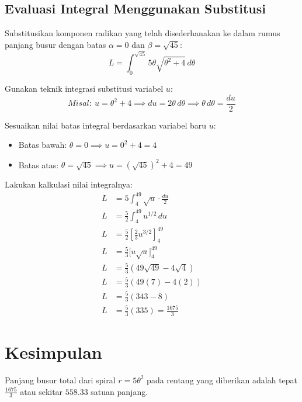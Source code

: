 \documentclass[11pt,a4paper]{article}
\begin{document}
\subsection{Evaluasi Integral Menggunakan Substitusi}
Substitusikan komponen radikan yang telah disederhanakan ke dalam rumus panjang busur dengan batas $\alpha = 0$ dan $\beta = \sqrt{45}$:
\begin{equation}
  L = \int_{0}^{\sqrt{45}} 5\theta\sqrt{\theta^2 + 4} \, d\theta
\end{equation}

Gunakan teknik integrasi substitusi variabel $u$:
\begin{equation*}
  Misal: \ u = \theta^2 + 4 \implies du = 2\theta \, d\theta \implies \theta \, d\theta = \frac{du}{2}
\end{equation*}

Sesuaikan nilai batas integral berdasarkan variabel baru $u$:
\begin{itemize}
  \item Batas bawah: $\theta = 0 \implies u = 0^2 + 4 = 4$
  \item Batas atas: $\theta = \sqrt{45} \implies u = (\sqrt{45})^2 + 4 = 49$
\end{itemize}

Lakukan kalkulasi nilai integralnya:
\begin{align*}
  L &= 5 \int_{4}^{49} \sqrt{u} \cdot \frac{du}{2} \\
  L &= \frac{5}{2} \int_{4}^{49} u^{1/2} \, du \\
  L &= \frac{5}{2} \left[ \frac{2}{3}u^{3/2} \right]_{4}^{49} \\
  L &= \frac{5}{3} \Big[ u\sqrt{u} \Big]_{4}^{49} \\
  L &= \frac{5}{3} \left( 49\sqrt{49} - 4\sqrt{4} \right) \\
  L &= \frac{5}{3} \left( 49(7) - 4(2) \right) \\
  L &= \frac{5}{3} (343 - 8) \\
  L &= \frac{5}{3} (335) = \frac{1675}{3}
\end{align*}

\section{Kesimpulan}
Panjang busur total dari spiral $r = 5\theta^2$ pada rentang yang diberikan adalah tepat \textbf{$\frac{1675}{3}$} atau sekitar \textbf{$558.33$} satuan panjang.
\end{document}
